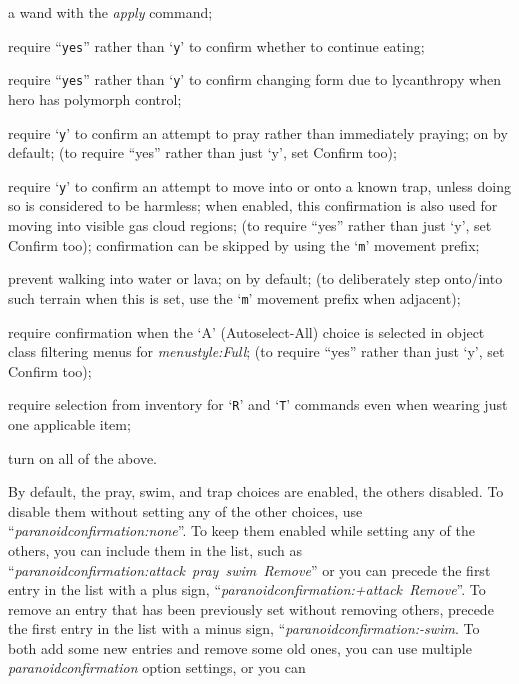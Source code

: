 \documentclass[titlepage]{article}
\begin{document}
\begin{description}[font=\mdseries\itshape]
\begin{description}[leftmargin=\pcwidth, topsep=1mm, itemsep=0mm, labelwidth=*, font=\ttfamily, align=right]
a wand with the \textit{apply} command;
\item[eating]
require ``\texttt{yes}'' rather than `\texttt{y}' to confirm whether to
continue eating;
\item[Were-change]
require ``\texttt{yes}'' rather than `\texttt{y}' to confirm changing form due
to lycanthropy when hero has polymorph control;
\item[pray]
require `\texttt{y}' to confirm an attempt to pray rather
than immediately praying; on by default;
(to require ``yes'' rather than just `y', set Confirm too);
\item[trap]
require `\texttt{y}' to confirm an attempt to move into or onto a known trap,
unless doing so is considered to be harmless;
when enabled, this confirmation is also used for moving into visible
gas cloud regions;
(to require ``yes'' rather than just `y', set Confirm too);
confirmation can be skipped by using the `\texttt{m}' movement prefix;
\item[swim]
prevent walking into water or lava; on by default; (to deliberately step
onto/into such terrain when this is set, use the `\texttt{m}'
movement prefix when adjacent);
\item[AutoAll]
require confirmation when the `A' (Autoselect-All) choice is selected
in object class filtering menus for \textit{menustyle:Full};
(to require ``yes'' rather than just `y', set Confirm too);
\item[Remove]
require selection from inventory for `\texttt{R}' and `\texttt{T}'
commands even when wearing just one applicable item;
\item[all]
turn on all of the above.
\end{description}
By default, the pray, swim, and trap choices are enabled, the others disabled.
To disable them without setting
any of the other choices, use ``\textit{paranoid\textunderscore confirmation:none}''.
To keep them enabled while setting any of the others, you can
include them in the list, such as
``\textit{par\-a\-noid\textunderscore con\-fir\-ma\-tion:attack~pray~swim~Remove}''
or you can precede the first entry in the list with a plus sign,
``\textit{paranoid\textunderscore confirmation:+attack~Remove}''.
To remove an entry that has been previously set without removing others,
precede the first entry in the list with a minus sign,
``\textit{paranoid\textunderscore confirmation:-swim}.
To both add some new entries and remove some old ones, you can use
multiple \textit{paranoid\textunderscore confirmation} option settings, or you can

\end{description}
\end{document}
